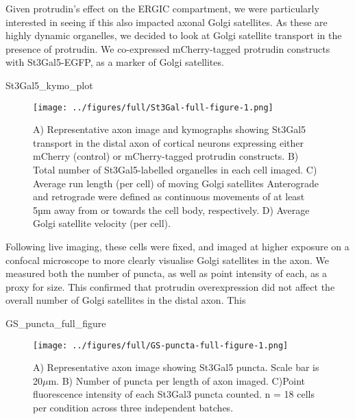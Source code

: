 \documentclass[
  12pt,
  a4paper,
]{article}
\newenvironment{Shaded}{\begin{snugshade}}{\end{snugshade}}
\newcommand{\NormalTok}[1]{#1}
\begin{document}
Given protrudin's effect on the ERGIC compartment, we were particularly
interested in seeing if this also impacted axonal Golgi satellites. As
these are highly dynamic organelles, we decided to look at Golgi
satellite transport in the presence of protrudin. We co-expressed
mCherry-tagged protrudin constructs with St3Gal5-EGFP, as a marker of
Golgi satellites.

\begin{Shaded}
\begin{Highlighting}[]
\NormalTok{St3Gal5\_kymo\_plot}
\end{Highlighting}
\end{Shaded}

\begin{figure}
\centering
\texttt{[image: ../figures/full/St3Gal-full-figure-1.png]}
\caption{A) Representative axon image and kymographs showing St3Gal5
transport in the distal axon of cortical neurons expressing either
mCherry (control) or mCherry-tagged protrudin constructs. B) Total
number of St3Gal5-labelled organelles in each cell imaged. C) Average
run length (per cell) of moving Golgi satellites Anterograde and
retrograde were defined as continuous movements of at least 5µm away
from or towards the cell body, respectively. D) Average Golgi satellite
velocity (per cell).}
\end{figure}

Following live imaging, these cells were fixed, and imaged at higher
exposure on a confocal microscope to more clearly visualise Golgi
satellites in the axon. We measured both the number of puncta, as well
as point intensity of each, as a proxy for size. This confirmed that
protrudin overexpression did not affect the overall number of Golgi
satellites in the distal axon. This

\begin{Shaded}
\begin{Highlighting}[]
\NormalTok{GS\_puncta\_full\_figure}
\end{Highlighting}
\end{Shaded}

\begin{figure}
\centering
\texttt{[image: ../figures/full/GS-puncta-full-figure-1.png]}
\caption{A) Representative axon image showing St3Gal5 puncta. Scale bar
is 20\(\mu\)m. B) Number of puncta per length of axon imaged. C)Point
fluorescence intensity of each St3Gal3 puncta counted. n = 18 cells per
condition across three independent batches.}
\end{figure}
\end{document}
